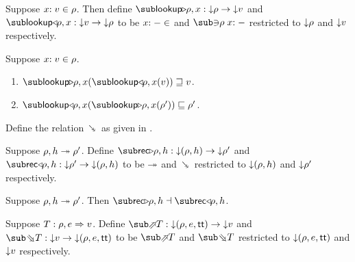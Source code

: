 \begin{definition}
   Suppose $x{:}\;v\in{\rho}$. Then define $\envLookupFwdF{\rho,x}: \Below{\rho} \to \Below{v}$ and $\envLookupBwdF{\rho,x}: \Below{v} \to \Below{\rho}$ to be $x{:}\;-\in$ and $\envLookupBwdR{\rho}\bind{x}{-}$ restricted to ${\downarrow}{\rho}$ and ${\downarrow}{v}$ respectively.
\end{definition}

\begin{lemma}
\label{lem:core-language:env-get-put}Suppose $x{:}\;v\in{\rho}$.
\begin{enumerate}
   \item \label{lem:core-language:env-get-put:1} $\envLookupFwdF{\rho,x}(\envLookupBwdF{\rho,x}(v)) \geq v$.
   \item \label{lem:core-language:env-get-put:2} $\envLookupBwdF{\rho,x}(\envLookupFwdF{\rho,x}(\rho')) \leq \rho'$.
\end{enumerate}
\end{lemma}

\begin{definition}
   \label{def:core-language:closeDefs-bwd}
   Define the relation $\closeDefsBwdR$ as given in .
\end{definition}

\begin{definition}
   Suppose $\rho, h \twoheadrightarrow \rho'$. Define $\closeDefsFwdF{\rho,h}: \Below{(\rho, h)} \to \Below{\rho'}$ and $\closeDefsBwdF{\rho,h}: \Below{\rho'} \to \Below{(\rho, h)}$ to be $\twoheadrightarrow$ and $\closeDefsBwdR$ restricted to ${\downarrow}{(\rho, h)}$ and ${\downarrow}{\rho'}$ respectively.
\end{definition}

\begin{theorem}
\label{thm:core-language:closeDefs:gc}
   Suppose $\rho, h \twoheadrightarrow \rho'$.  Then $\closeDefsFwdF{\rho,h} \adjoint \closeDefsBwdF{\rho,h}$.
\end{theorem}

\begin{definition}
   Suppose $T: \rho, e \Rightarrow v$. Define $\evalFwdF{T}: \Below{(\rho, e, \TT)} \to \Below{v}$ and $\evalBwdF{T}: \Below{v} \to \Below{(\rho, e, \TT)}$ to be $\evalFwdR{T}$ and $\evalBwdR{T}$ restricted to ${\downarrow}{(\rho, e, \mathsf{tt})}$ and ${\downarrow}{v}$ respectively.
\end{definition}

